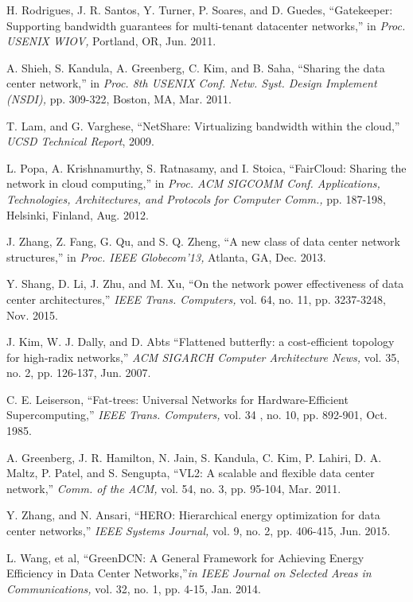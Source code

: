 \documentclass[twocolumn,10pt]{IEEEtran}
\begin{document}
\begin{thebibliography}{1}
H. Rodrigues, J. R. Santos, Y. Turner, P. Soares, and D. Guedes, ``Gatekeeper: Supporting bandwidth guarantees for multi-tenant datacenter networks,'' in {\em \it Proc. USENIX WIOV,} Portland, OR, Jun. 2011.

A. Shieh, S. Kandula, A. Greenberg, C. Kim, and B. Saha, ``Sharing the data center network,'' in {\em \it  Proc. 8th USENIX Conf. Netw. Syst. Design Implement (NSDI),} pp. 309-322, Boston, MA, Mar. 2011.

T. Lam, and G. Varghese, ``NetShare: Virtualizing bandwidth within the cloud,'' {\em \it  UCSD Technical Report}, 2009.

L. Popa, A. Krishnamurthy, S. Ratnasamy, and I. Stoica, ``FairCloud: Sharing the network in cloud computing,'' in {\em \it Proc. ACM SIGCOMM Conf. Applications, Technologies, Architectures, and Protocols for Computer Comm.,} pp. 187-198, Helsinki, Finland, Aug. 2012.


J. Zhang, Z. Fang, G. Qu, and S. Q. Zheng, ``A new class of data center network structures,'' in {\em \it Proc. IEEE Globecom'13,} Atlanta, GA, Dec. 2013.

Y. Shang, D. Li, J. Zhu, and M. Xu, ``On the network power effectiveness of data center architectures,'' {\em \it IEEE Trans. Computers,} vol. 64, no. 11, pp. 3237-3248, Nov. 2015.



J. Kim, W. J. Dally, and D. Abts ``Flattened butterfly: a cost-efficient topology for high-radix networks,'' {\em \it ACM SIGARCH Computer Architecture News,} vol. 35, no. 2, pp. 126-137, Jun. 2007.

C. E. Leiserson, ``Fat-trees: Universal Networks for Hardware-Efficient
Supercomputing,'' {\em \it IEEE Trans. Computers,} vol. 34 , no. 10,
pp. 892-901, Oct. 1985.

A. Greenberg, J. R. Hamilton, N. Jain, S. Kandula, C. Kim, P. Lahiri, D. A. Maltz, P. Patel, and S. Sengupta, ``VL2: A scalable and flexible data center network,'' {\em \it Comm. of the ACM,} vol. 54, no. 3, pp. 95-104, Mar. 2011.

Y. Zhang, and N. Ansari, ``HERO: Hierarchical energy optimization for data center networks,'' {\em \it IEEE Systems Journal,} vol. 9, no. 2, pp. 406-415, Jun. 2015.


L. Wang, et al, ``GreenDCN: A General Framework for Achieving Energy Efficiency in Data Center Networks,''{\em \it in IEEE Journal on Selected Areas in Communications,} vol. 32, no. 1, pp. 4-15, Jan. 2014.


\end{thebibliography}
\end{document}
